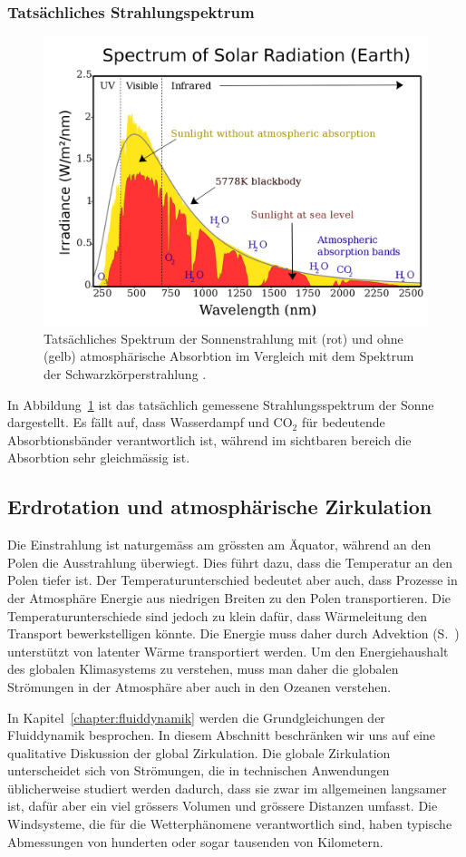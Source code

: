\subsubsection{Tatsächliches Strahlungspektrum}
\begin{figure}
\centering
\includegraphics[width=0.7\hsize]{chapters/1/Solar_spectrum_en.png}
\caption{Tatsächliches Spektrum der Sonnenstrahlung mit (rot) und
ohne (gelb) atmosphärische Absorbtion im Vergleich mit dem Spektrum
der Schwarzkörperstrahlung \cite{skript:sunlight}.
\label{skript:strahlungsspektrum}}
\end{figure}
In Abbildung~\ref{skript:strahlungsspektrum} ist das tatsächlich gemessene
Strahlungsspektrum der Sonne dargestellt.
Es fällt auf, dass Wasserdampf und $\text{CO}_2$  für bedeutende
Absorbtionsbänder verantwortlich ist, während im sichtbaren bereich
die Absorbtion sehr gleichmässig ist.

\subsection{Erdrotation und atmosphärische Zirkulation}
Die Einstrahlung ist naturgemäss am grössten am Äquator, während an
den Polen die Ausstrahlung überwiegt.
Dies führt dazu, dass die Temperatur an den Polen tiefer ist.
Der Temperaturunterschied bedeutet aber auch, dass Prozesse in
der Atmosphäre Energie aus niedrigen Breiten zu den Polen
transportieren.
Die Temperaturunterschiede sind jedoch zu klein dafür, dass Wärmeleitung
den Transport bewerkstelligen könnte.
Die Energie muss daher durch Advektion (S.~\pageref{skript:advektion})
unterstützt von latenter Wärme transportiert werden.
Um den Energiehaushalt des globalen Klimasystems zu verstehen, muss
man daher die globalen Strömungen in der Atmosphäre aber auch in
den Ozeanen verstehen.

In Kapitel~\ref{chapter:fluiddynamik} werden die Grundgleichungen
der Fluiddynamik besprochen.
In diesem Abschnitt beschränken wir uns auf eine qualitative
Diskussion der global Zirkulation.
Die globale Zirkulation unterscheidet sich von Strömungen, die 
in technischen Anwendungen üblicherweise studiert werden dadurch,
dass sie zwar im allgemeinen langsamer ist, dafür aber ein viel grössers
Volumen und grössere Distanzen umfasst.
Die Windsysteme, die für die Wetterphänomene verantwortlich sind,
haben typische Abmessungen von hunderten oder sogar tausenden von
Kilometern.

